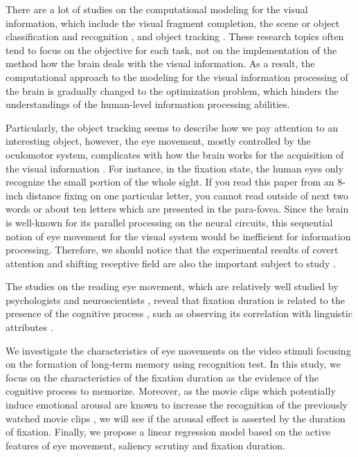 \documentclass[10pt,letterpaper]{article}
\begin{document}
There are a lot of studies on the computational modeling for the visual information, which include the visual fragment completion, the scene or object classification and recognition \cite{winn2005,lazebnik2006}, and object tracking \cite{YiWu2013}. These research topics often tend to focus on the objective for each task, not on the implementation of the method how the brain deals with the visual information. As a result, the computational approach to the modeling for the visual information processing of the brain is gradually changed to the optimization problem, which hinders the understandings of the human-level information processing abilities. 

Particularly, the object tracking seems to describe how we pay attention to an interesting object, however, the eye movement, mostly controlled by the oculomotor system, complicates with how the brain works for the acquisition of the visual information \cite{Henderson2003}. For instance, in the fixation state, the human eyes only recognize the small portion of the whole sight. If you read this paper from an 8-inch distance fixing on one particular letter, you cannot read outside of next two words or about ten letters which are presented in the para-fovea. Since the brain is well-known for its parallel processing on the neural circuits, this sequential notion of eye movement for the visual system would be inefficient for information processing. Therefore, we should notice that the experimental results of covert attention and shifting receptive field are also the important subject to study \cite{Zirnsak2014}.

The studies on the reading eye movement, which are relatively well studied by psychologists and neuroscientists \cite{Rayner1998,Reichle1998}, reveal that fixation duration is related to the presence of the cognitive process \cite{Rayner1997}, such as observing its correlation with linguistic attributes \cite{Inhoff1986,Rayner1986}.

We investigate the characteristics of eye movements on the video stimuli focusing on the formation of long-term memory using recognition test. In this study, we focus on the characteristics of the fixation duration as the evidence of the cognitive process to memorize. Moreover, as the movie clips which potentially induce emotional arousal are known to increase the recognition of the previously watched movie clips \cite{Cahill1996amyg,Cahill1998baso}, we will see if the arousal effect is asserted by the duration of fixation. Finally, we propose a linear regression model based on the active features of eye movement, saliency scrutiny and fixation duration.
\end{document}
